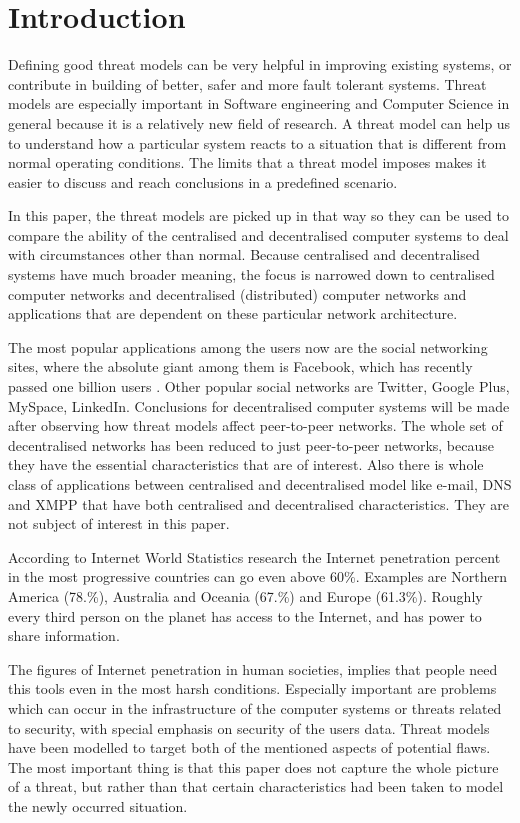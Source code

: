 \newpage
\section{Introduction}
Defining good threat models can be very helpful in improving existing systems, or contribute in building of better, safer and more fault tolerant systems.
Threat models are especially important in Software engineering and Computer Science in general because it is a relatively new field of research.
A threat model can help us to understand how a particular system reacts to a situation that is different from normal operating conditions.
The limits that a threat model imposes makes it easier to discuss and reach conclusions in a predefined scenario.

In this paper, the threat models are picked up in that way so they can be used to compare the ability of the centralised and decentralised computer systems to deal with circumstances other than normal.
Because centralised and decentralised systems have much broader meaning, the focus is narrowed down to centralised computer networks and decentralised (distributed) computer networks and applications that are dependent on these particular network architecture.

The most popular applications among the users now are the social networking sites, where the absolute giant among them is Facebook, which has recently passed one billion users \cite{web:facebookpassesbillion}. Other popular social networks are Twitter, Google Plus, MySpace, LinkedIn.
Conclusions for decentralised computer systems will be made after observing how threat models affect peer-to-peer networks.
The whole set of decentralised networks has been reduced to just peer-to-peer networks, because they have the essential characteristics that are of interest.
Also there is whole class of applications between centralised and decentralised model like e-mail, DNS and XMPP that have both centralised and decentralised characteristics.
They are not subject of interest in this paper.

According to Internet World Statistics research \cite{web:internetworldstats} the Internet penetration percent in the most progressive countries can go even above 60\%.
Examples are Northern America (78.\%), Australia and Oceania (67.\%) and Europe (61.3\%).
Roughly every third person on the planet has access to the Internet, and has power to share information. 

The figures of Internet penetration \cite{web:internetworldstats} in human societies, implies that people need this tools even in the most harsh conditions.
Especially important are problems which can occur in the infrastructure of the computer systems or threats related to security, with special emphasis on security of the users data.
Threat models have been modelled to target both of the mentioned aspects of potential flaws.
The most important thing is that this paper does not capture the whole picture of a threat, but rather than that certain characteristics had been taken to model the newly occurred situation.

